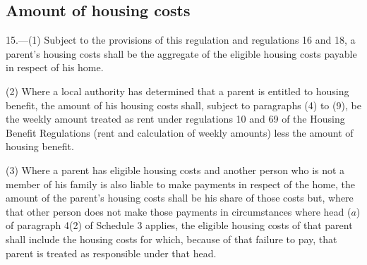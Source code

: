 \documentclass[12pt,a4paper]{article}
\begin{document}
\subsection[15. Amount of housing costs]{Amount of housing costs}

15.—(1) Subject to the provisions of this regulation and 
regulations 16 and 18,  %
a parent’s housing costs shall be the aggregate of the eligible housing costs payable in respect of his home.

(2) Where a local authority has determined that a parent is entitled to housing benefit, the amount of his housing costs shall, subject to paragraphs (4) to (9), be the weekly amount treated as rent under regulations 10 and 69 of the Housing Benefit Regulations (rent and calculation of weekly amounts) less the amount of housing benefit.

(3) Where a parent has eligible housing costs and another person who is not a member of his family is also liable to make payments in respect of the home, the amount of the parent’s housing costs shall be his share of those costs
but, where that other person does not make those payments in circumstances where head ($a$) of paragraph 4(2) of Schedule 3 applies, the eligible housing costs of that parent shall include the housing costs for which, because of that failure to pay, that parent is treated as responsible under that head.  %
\end{document}
